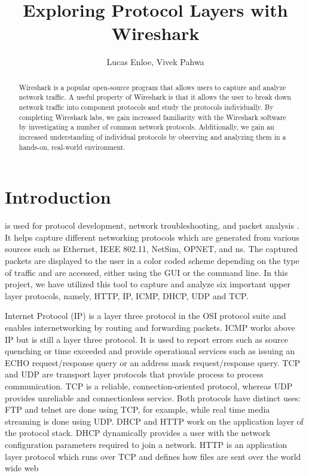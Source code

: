 \documentclass[10pt]{IEEEtran}
\title{Exploring Protocol Layers with Wireshark}
\author{Lucas Enloe, Vivek Pahwa}
\begin{document}
\maketitle

\begin{abstract}
Wireshark is a popular open-source program that allows users to capture and analyze network traffic. A useful property of Wireshark is that it allows the user to break down network traffic into component protocols and study the protocols individually. By completing Wireshark labs, we gain increased familiarity with the Wireshark software by investigating a number of common network protocols. Additionally, we gain an increased understanding of individual protocols by observing and analyzing them in a hands-on, real-world environment.
\end{abstract}

\section{Introduction}
 is used for protocol development, network troubleshooting, and packet analysis \cite{wireshark}. It helps capture different networking protocols which are generated from various sources such as Ethernet, IEEE 802.11, NetSim, OPNET, and ns. The captured packets are displayed to the user in a color coded scheme depending on the type of traffic and are accessed, either using the GUI or the command line. In this project, we have utilized this tool to capture and analyze six important upper layer protocols, namely, HTTP, IP, ICMP, DHCP, UDP and TCP.

 Internet Protocol (IP) is a layer three protocol in the OSI protocol suite and enables internetworking by routing and forwarding packets. ICMP works above IP but is still a layer three protocol. It is used to report errors such as source quenching or time exceeded and provide operational services such as issuing an ECHO request/response query or an address mask request/response query. TCP and UDP are transport layer protocols that provide process to process communication. TCP is a reliable, connection-oriented protocol, whereas UDP provides unreliable and connectionless service. Both protocols have distinct uses: FTP and telnet are done using TCP, for example, while real time media streaming is done using UDP. DHCP and HTTP work on the application layer of the protocol stack. DHCP dynamically provides a user with the network configuration parameters required to join a network. HTTP is an application layer protocol which runs over TCP and defines how files are sent over the world wide web \cite{tanenbaum}
 
\end{document}

